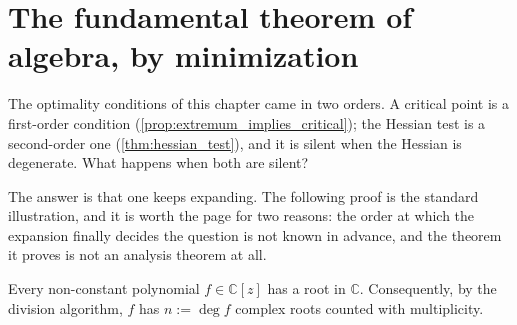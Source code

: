 
\section{The fundamental theorem of algebra, by minimization}
\label{sec:fundamental_theorem_of_algebra}

The optimality conditions of this chapter came in two orders. A critical point is a first-order
condition (\cref{prop:extremum_implies_critical}); the Hessian test is a second-order one
(\cref{thm:hessian_test}), and it is silent when the Hessian is degenerate. What happens when
both are silent?

The answer is that one keeps expanding. The following proof is the standard illustration, and it
is worth the page for two reasons: the order at which the expansion finally decides the question
is not known in advance, and the theorem it proves is not an analysis theorem at all.

\begin{theorem}
\label{thm:fundamental_theorem_of_algebra}
Every non-constant polynomial $f \in \mathbb{C}[z]$ has a root in $\mathbb{C}$. Consequently, by
the division algorithm, $f$ has $n := \deg f$ complex roots counted with multiplicity.
\end{theorem}

